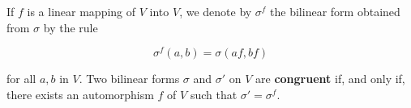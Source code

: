 If $f$ is a linear mapping of $V$ into $V$, we denote by $\sigma^f$ the bilinear form obtained from $\sigma$ by the rule

$$\sigma^f(a, b) = \sigma(af, bf)$$

for all $a, b$ in $V$. Two bilinear forms $\sigma$ and $\sigma'$ on $V$ are \textbf{congruent} if, and only if, there exists an automorphism $f$ of $V$ such that $\sigma' = \sigma^f$.
